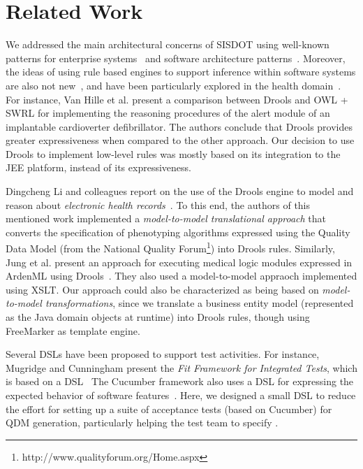 \section{Related Work}
\label{sec:related}

We addressed the main architectural concerns of SISDOT 
using well-known patterns for enterprise
systems~\cite{enterprise-patterns:book} and
software architecture patterns~\cite{pattern-oriented:book}.
Moreover, the ideas of using rule based engines to support
inference within software systems are also not new~\cite{ORDONEZ2016353,li2012modeling},
and have been particularly explored in the health
domain~\cite{mantas2012comparing,li2012modeling,jung2011executing}.
For instance, Van Hille et al. present a comparison
between Drools and OWL + SWRL for implementing the reasoning
procedures of the alert module of an implantable
cardioverter defibrillator. The authors conclude that
Drools provides greater expressiveness when compared to the other
approach. Our decision to use Drools to implement
low-level rules was mostly based on its integration to
the JEE platform, instead of its expressiveness.

Dingcheng Li and colleagues report on the use of the
Drools engine to model and reason about \emph{electronic
  health records}~\cite{li2012modeling}. To this end,
the authors of this mentioned work implemented a
\emph{model-to-model translational approach} that
converts the specification of phenotyping algorithms 
expressed using the Quality Data Model (from the National
Quality Forum\footnote{http://www.qualityforum.org/Home.aspx})
into Drools rules. Similarly, Jung et al. present an approach
for executing medical logic modules expressed in ArdenML
using Drools~\cite{jung2011executing}. They also used a model-to-model appraoch
implemented using XSLT. Our approach could also be characterized
as being based on \emph{model-to-model transformations}, since we translate
a business entity model (represented as the \callers Java
domain objects at runtime) into Drools rules, though using FreeMarker as 
template engine.

Several DSLs have been proposed to support test activities.
For instance, Mugridge and Cunningham present the \emph{Fit
Framework for Integrated Tests}, which is based on a DSL~\cite{Mugridge:2005:FDS:1051337}
The Cucumber framework also uses a DSL for expressing
the expected behavior of software features~\cite{Wynne:2012:CBB:2331446}. Here, we
designed a small DSL to reduce the effort for setting up
a suite of acceptance tests (based on Cucumber) for QDM generation, particularly helping
the test team to specify \callers. 